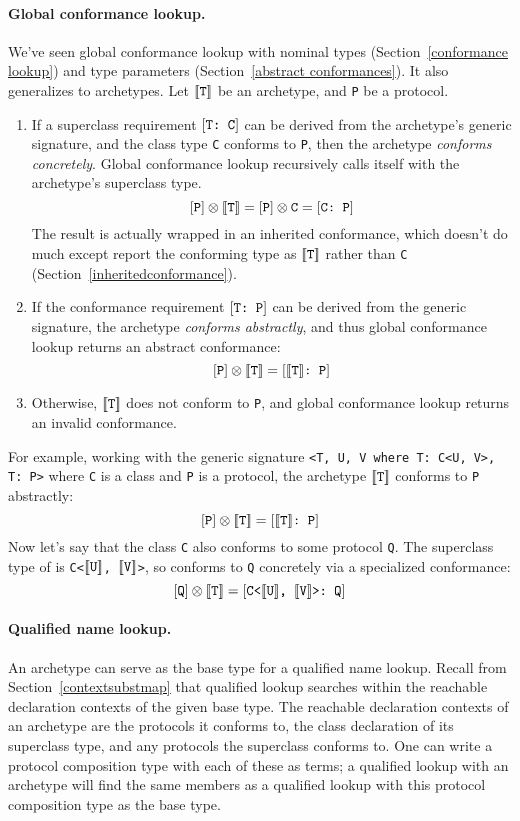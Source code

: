 \documentclass[../generics]{subfiles}
\begin{document}
\paragraph{Global conformance lookup.} We've seen global conformance lookup with nominal types (Section~\ref{conformance lookup}) and type parameters (Section~\ref{abstract conformances}). It also generalizes to archetypes. Let $[\![\texttt{T}]\!]$ be an archetype, and \texttt{P} be a protocol.
\begin{enumerate}
\item If a superclass requirement $[\texttt{T:~C}]$ can be derived from the archetype's generic signature, and the class type \texttt{C} conforms to \texttt{P}, then the archetype \emph{conforms concretely}. Global conformance lookup recursively calls itself with the archetype's superclass type.
\[[\texttt{P}]\otimes[\![\texttt{T}]\!]=[\texttt{P}]\otimes\texttt{C}=[\texttt{C:~P}]\]
The result is actually wrapped in an inherited conformance, which doesn't do much except report the conforming type as $[\![\texttt{T}]\!]$ rather than \texttt{C} (Section~\ref{inheritedconformance}).
\item If the conformance requirement $[\texttt{T:~P}]$ can be derived from the generic signature, the archetype \emph{conforms abstractly}, and thus global conformance lookup returns an abstract conformance:
\[[\texttt{P}]\otimes[\![\texttt{T}]\!]=[\texttt{$[\![\texttt{T}]\!]$:~P}]\]
\item Otherwise, $[\![\texttt{T}]\!]$ does not conform to \texttt{P}, and global conformance lookup returns an invalid conformance.
\end{enumerate}
For example, working with the generic signature \verb|<T, U, V where T: C<U, V>, T: P>| where \texttt{C} is a class and \texttt{P} is a protocol, the archetype $[\![\texttt{T}]\!]$ conforms to \texttt{P} abstractly:
\[
[\texttt{P}]\otimes [\![\texttt{T}]\!] = [\texttt{$[\![\texttt{T}]\!]$:~P}]
\]
Now let's say that the class \texttt{C} also conforms to some protocol \texttt{Q}. The superclass type of  is \texttt{C<$[\![\texttt{U}]\!]$, $[\![\texttt{V}]\!]$>}, so  conforms to \texttt{Q} concretely via a specialized conformance:
\[
[\texttt{Q}]\otimes [\![\texttt{T}]\!] = [\texttt{C<$[\![\texttt{U}]\!]$, $[\![\texttt{V}]\!]$>:~Q}]
\]

\paragraph{Qualified name lookup.} An archetype can serve as the base type for a qualified name lookup. Recall from Section~\ref{contextsubstmap} that qualified lookup searches within the reachable declaration contexts of the given base type. The reachable declaration contexts of an archetype are the protocols it conforms to, the class declaration of its superclass type, and any protocols the superclass conforms to. One can write a protocol composition type with each of these as terms; a qualified lookup with an archetype will find the same members as a qualified lookup with this protocol composition type as the base type.
\end{document}
